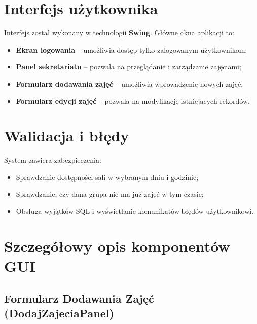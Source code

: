 \section{Interfejs użytkownika}

Interfejs został wykonany w technologii \textbf{Swing}. Główne okna aplikacji to:

\begin{itemize}
    \item \textbf{Ekran logowania} – umożliwia dostęp tylko zalogowanym użytkownikom;
    \item \textbf{Panel sekretariatu} – pozwala na przeglądanie i zarządzanie zajęciami;
    \item \textbf{Formularz dodawania zajęć} – umożliwia wprowadzenie nowych zajęć;
    \item \textbf{Formularz edycji zajęć} – pozwala na modyfikację istniejących rekordów.
\end{itemize}

\section{Walidacja i błędy}

System zawiera zabezpieczenia:

\begin{itemize}
    \item Sprawdzanie dostępności sali w wybranym dniu i godzinie;
    \item Sprawdzanie, czy dana grupa nie ma już zajęć w tym czasie;
    \item Obsługa wyjątków SQL i wyświetlanie komunikatów błędów użytkownikowi.
\end{itemize}

\section{Szczegółowy opis komponentów GUI}

\subsection {Formularz Dodawania Zajęć (DodajZajeciaPanel)}


